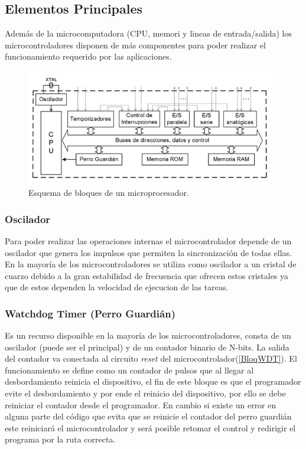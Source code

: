 \documentclass[letterpaper,12pt,oneside]{book}
\begin{document}
			\subsection{Elementos Principales}
			Además de la microcomputadora (CPU, memori y lineas de entrada/salida) los microcontroladores disponen de más componentes para poder realizar el funcionamiento requerido por las aplicaciones.

			\begin{figure}[!htpb]
				\centering
				\includegraphics[scale = 1.0]{Material de Consulta/BloqMicro.PNG}
				\caption[Esquema de bloques de un microprocesador]{Esquema de bloques de un microprocesador.}
				\label{BloqMicro}
			\end{figure}

				\subsubsection{Oscilador}
				Para poder realizar las operaciones internas el microcontrolador depende de un oscilador que genera los impulsos que permiten la sincronización de todas ellas. En la mayoría de los microcontroladores se utiliza como oscilador a un cristal de cuarzo debido a la gran estabilidad de frecuencia que ofrecen estos cristales ya que de estos dependen la velocidad de ejecucion de las tareas.

				\subsubsection{Watchdog Timer (Perro Guardián)}
				Es un recurso disponible en la mayoría de los microcontroladores, consta de un oscilador (puede ser el principal) y de un contador binario de N-bits. La salida del contador va conectada al circuito \textit{reset} del microcontrolador(\ref{BloqWDT}). El funcionamiento se define como un contador de pulsos que al llegar al desbordamiento reinicia el dispositivo, el fin de este bloque es que el programador evite el desbordamiento y por ende el reinicio del dispositivo, por ello se debe reiniciar el contador desde el programador. En cambio si existe un error en alguna parte del código que evita que se reinicie el contador del perro guardián este reiniciará el microcontrolador y será posible retomar el control y redirigir el programa por la ruta correcta.
\end{document}
